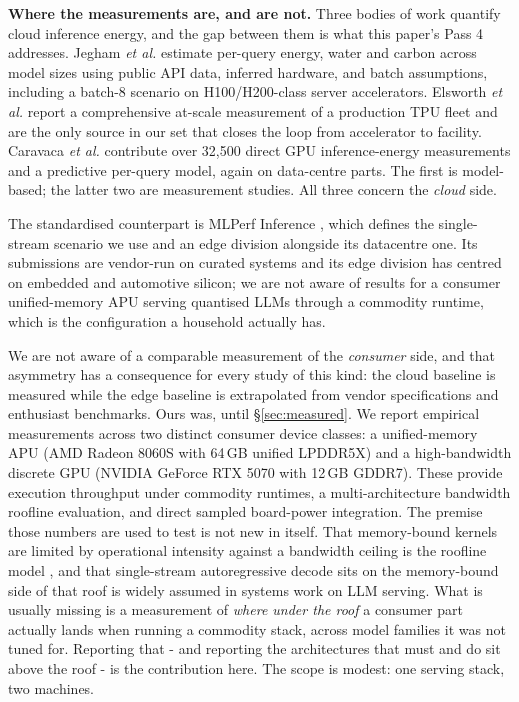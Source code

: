 \documentclass[conference]{IEEEtran}
\begin{document}
\textbf{Where the measurements are, and are not.}
Three bodies of work quantify cloud inference energy, and the gap between them
is what this paper's Pass 4 addresses. Jegham \emph{et al.} \cite{jegham2025}
estimate per-query energy, water and carbon across model sizes using public API
data, inferred hardware, and batch assumptions, including a batch-8 scenario on
H100/H200-class server accelerators. Elsworth \emph{et al.}
\cite{elsworth2025} report a comprehensive at-scale measurement of a production
TPU fleet and are the only source in our set that closes the loop from
accelerator to facility. Caravaca \emph{et al.} \cite{caravaca2025} contribute
over 32{,}500 direct GPU inference-energy measurements and a predictive
per-query model, again on data-centre parts. The first is model-based; the latter
two are measurement studies. All three concern the \emph{cloud} side.

The standardised counterpart is MLPerf Inference \cite{reddi2020mlperf}, which
defines the single-stream scenario we use and an edge division alongside its
datacentre one. Its submissions are vendor-run on curated systems and its edge
division has centred on embedded and automotive silicon; we are not aware of
results for a consumer unified-memory APU serving quantised LLMs through a
commodity runtime, which is the configuration a household actually has.

We are not aware of a comparable measurement of the \emph{consumer} side, and
that asymmetry has a consequence for every study of this kind: the cloud
baseline is measured while the edge baseline is extrapolated from vendor
specifications and enthusiast benchmarks. Ours was, until \S\ref{sec:measured}.
We report empirical measurements across two distinct consumer device classes: a
unified-memory APU (AMD Radeon 8060S with 64\,GB unified LPDDR5X) and a
high-bandwidth discrete GPU (NVIDIA GeForce RTX 5070 with 12\,GB GDDR7). These
provide execution throughput under commodity runtimes, a multi-architecture
bandwidth roofline evaluation, and direct sampled board-power integration.
The premise those numbers are used to test is not new in itself. That
memory-bound kernels are limited by operational intensity against a bandwidth
ceiling is the roofline model \cite{williams2009roofline}, and that
single-stream autoregressive decode sits on the memory-bound side of that roof
is widely assumed in systems work on LLM serving. What is usually missing is a
measurement of \emph{where under the roof} a consumer part actually lands when
running a commodity stack, across model families it was not tuned for. Reporting
that - and reporting the architectures that must and do sit above the roof - is
the contribution here. The scope is modest: one serving stack, two machines.
\end{document}
